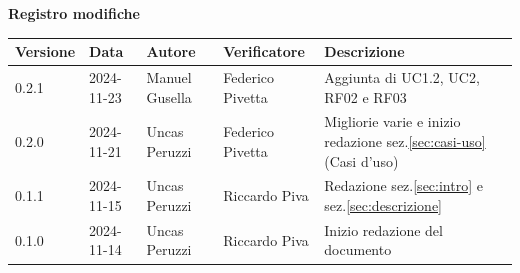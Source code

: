 \documentclass[11pt]{article}
\begin{document}
\centering\textbf{Registro modifiche}\\
\vspace{2mm}
\begin{tabularx}{\textwidth}{|l|l|l|l|X|}
\hline
\textbf{Versione} & \textbf{Data} & \textbf{Autore} & \textbf{Verificatore} & \textbf{Descrizione} \\
\hline
0.2.1 & 2024-11-23 & Manuel Gusella  & Federico Pivetta & Aggiunta di UC1.2, UC2, RF02 e RF03 \\
\hline
0.2.0 & 2024-11-21 & Uncas Peruzzi  & Federico Pivetta & Migliorie varie e inizio redazione sez.\ref{sec:casi-uso} (Casi d'uso) \\
\hline
0.1.1 & 2024-11-15 & Uncas Peruzzi  & Riccardo Piva & Redazione sez.\ref{sec:intro} e sez.\ref{sec:descrizione} \\
\hline
0.1.0 & 2024-11-14 & Uncas Peruzzi  & Riccardo Piva & Inizio redazione del documento\\
\hline
\end{tabularx}
\newpage
\tableofcontents
\listoffigures %
\end{document}
